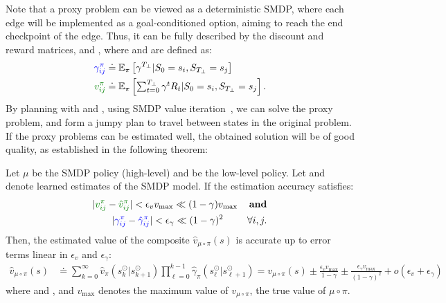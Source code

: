Note that a proxy problem can be viewed as a deterministic SMDP, where each edge will be implemented as a goal-conditioned option, aiming to reach the end checkpoint of the edge. Thus, it can be fully described by the discount and reward matrices, \blue{$\Gamma^\pi$} and , where  and  are defined as:
\begin{align}
    \blue{\gamma^\pi_{ij}} &\doteq \mathbb{E}_\pi\left[\gamma^{T_\perp} | S_0=s_i, S_{T_\perp}=s_j\right] \\
    \darkgreen{v^\pi_{ij}} &\doteq \textstyle\mathbb{E}_\pi\left[\sum_{t=0}^{T_\perp} \gamma^t R_t | S_0=s_i, S_{T_\perp}=s_j\right].
\end{align}
By planning with \blue{$\Gamma^\pi$} and , \eg{} using SMDP value iteration~\citep{sutton1999between}, we can solve the proxy problem, and form a jumpy plan to travel between states in the original problem. If the proxy problems can be estimated well, the obtained solution will be of good quality, as established in the following theorem:

\begin{theorem}\label{thm:overall_perf}
Let $\mu$ be the SMDP policy (high-level) and \red{$\pi$} be the low-level policy. Let  and \blue{$\hat{\Gamma}^\pi$} denote learned estimates of the SMDP model. If the estimation accuracy satisfies:
\begin{align}
    & |\darkgreen{v^\pi_{ij}}-\darkgreen{\hat{v}^\pi_{ij}}|<\epsilon_v  v_{\text{max}} \ll (1-\gamma)  v_{\text{max}} & \text{\textbf{and}}\\
    & \quad\quad |\blue{\gamma^\pi_{ij}} -\blue{\hat{\gamma}^\pi_{ij}}|<\epsilon_\gamma\ll (1-\gamma)^2 & \forall i,j. \nonumber
\end{align}
Then, the estimated value of the composite $\hat{v}_{\mu\circ \pi}(s)$ is accurate up to error terms linear in $\epsilon_v$ and $\epsilon_\gamma$:
\begin{align}
    \hat{v}_{\mu\circ \pi}(s) &\doteq \sum_{k=0}^\infty \hat{v}_\pi(s_k^\odot |{s}_{k+1}^\odot ) \prod_{\ell=0}^{k-1}\hat{\gamma}_\pi (s_\ell^\odot | s_{\ell+1}^\odot ) = v_{\mu\circ \pi }(s) \pm \frac{\epsilon_v  v_{\text{max}}}{1-\gamma} \pm \frac{\epsilon_\gamma v_{\text{max}}}{(1-\gamma)^2}  + o(\epsilon_v+\epsilon_\gamma) \nonumber
\end{align}
where  and , and $v_{\text{max}}$ denotes the maximum value of $v_{\mu \circ \pi }$, the true value of $\mu \circ \pi$.
\end{theorem}

